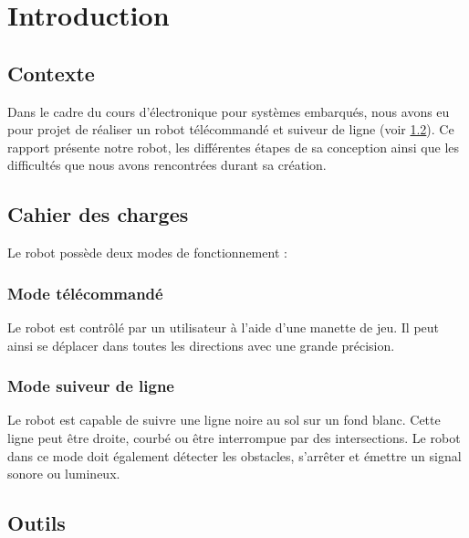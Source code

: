 \chapter{Introduction}

\section{Contexte}

Dans le cadre du cours d'électronique pour systèmes embarqués,
nous avons eu pour projet de réaliser un robot télécommandé et suiveur de ligne (voir \ref{cahier_des_charges}).
Ce rapport présente notre robot, les différentes étapes de sa conception ainsi que les difficultés que nous avons rencontrées durant sa création.

\section{Cahier des charges} \label{cahier_des_charges}

Le robot possède deux modes de fonctionnement :

\subsection{Mode télécommandé}

Le robot est contrôlé par un utilisateur à l'aide d'une manette de jeu.
Il peut ainsi se déplacer dans toutes les directions avec une grande précision.

\subsection{Mode suiveur de ligne}

Le robot est capable de suivre une ligne noire au sol sur un fond blanc.
Cette ligne peut être droite, courbé ou être interrompue par des intersections.
Le robot dans ce mode doit également détecter les obstacles, s'arrêter et émettre un signal sonore ou lumineux.

\section{Outils}

